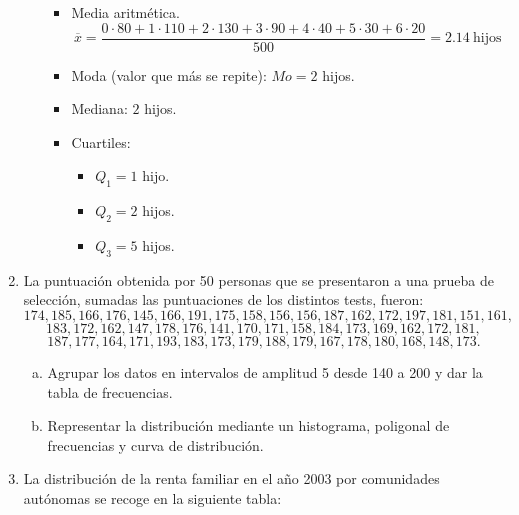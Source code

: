 \documentclass[]{article}
\begin{document}
\begin{enumerate}[{Ejercicio} 1.]
\begin{enumerate}[a)]
 			\begin{itemize}
 				\item Media aritmética. $$\overline{x} = \dfrac{0 \cdot 80 + 1 \cdot 110 + 2 \cdot 130 + 3 \cdot 90 + 4 \cdot 40 + 5 \cdot 30 + 6 \cdot 20}{500} = 2.14 ~\text{hijos}$$
 				\item Moda (valor que más se repite): $Mo = 2$ hijos.
 				\item Mediana: $2$ hijos.
 				\item Cuartiles:
 					\begin{itemize}
 						\item $Q_1 = 1$ hijo.
 						\item $Q_2 = 2$ hijos.
 						\item $Q_3 = 5$ hijos.
 					\end{itemize}
 			\end{itemize}
		 \end{enumerate}
		\item La puntuación obtenida por 50 personas que se presentaron a una prueba de selección, sumadas las puntuaciones de los distintos tests, fueron: $$174, 185,166,176,145,166,191,175,158,156,156,187,162,172,197,181,151,161,$$$$183,172,162,147,178,176,141,170,171,158,184,173,169,162,172,181,$$$$187,177,164,171,193,183,173,179,188,179,167,178,180,168,148,173.$$
		
		\begin{enumerate}[a)]
			\item Agrupar los datos en intervalos de amplitud 5 desde 140 a 200 y dar la tabla de frecuencias.
			\item Representar la distribución mediante un histograma, poligonal de frecuencias y curva de distribución.
		\end{enumerate}
	
		\item La distribución de la renta familiar en el año 2003 por comunidades autónomas se recoge en la siguiente tabla: 
		

\end{enumerate}
\end{document}
